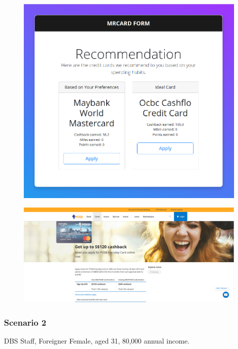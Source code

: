 		\begin{figure}[H]
			\centering
			\includegraphics[width=\linewidth]{img/scenario1_recommendation_v2.png}
		\end{figure}

		\begin{figure}[H]
			\centering
			\includegraphics[width=\linewidth]{img/scenario1_apply_ideal_credit_card.png}
		\end{figure}


	\subsubsection{Scenario 2} %
	\label{ssub:scenario_2}
		DBS Staff, Foreigner Female, aged 31, 80,000 annual income.

